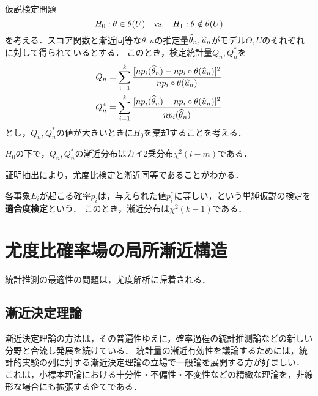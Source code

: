 \documentclass[uplatex,dvipdfmx]{jsreport}
\begin{document}
\begin{problem}
    仮説検定問題
    \[H_0:\theta\in\theta(U)\quad\mathrm{vs.}\quad H_1:\theta\notin\theta(U)\]
    を考える．スコア関数と漸近同等な$\theta,u$の推定量$\widehat{\theta}_n,\widehat{u}_n$がモデル$\Theta,U$のそれぞれに対して得られているとする．
    このとき，検定統計量$Q_n,Q_n^*$を
    \begin{align*}
        Q_n&=\sum^k_{i=1}\frac{[np_i(\widehat{\theta}_n)-np_i\circ\theta(\widehat{u}_n)]^2}{np_i\circ\theta(\widehat{u}_n)}\\
        Q_n^*&=\sum^k_{i=1}\frac{[np_i(\widehat{\theta}_n)-np_i\circ\theta(\widehat{u}_n)]^2}{np_i(\widehat{\theta}_n)}
    \end{align*}
    とし，$Q_n,Q_n^*$の値が大きいときに$H_0$を棄却することを考える．
\end{problem}

\begin{theorem}
    $H_0$の下で，$Q_n,Q_n^*$の漸近分布はカイ2乗分布$\chi^2(l-m)$である．
\end{theorem}
\begin{remarks}
    証明抽出により，尤度比検定と漸近同等であることがわかる．
\end{remarks}

\begin{example}
    各事象$E_i$が起こる確率$p_i$は，与えられた値$p^*_i$に等しい，という単純仮説の検定を\textbf{適合度検定}という．
    このとき，漸近分布は$\chi^2(k-1)$である．
\end{example}

\section{尤度比確率場の局所漸近構造}

\begin{tcolorbox}[colframe=ForestGreen, colback=ForestGreen!10!white,breakable,colbacktitle=ForestGreen!40!white,coltitle=black,fonttitle=\bfseries\sffamily,
title=]
    統計推測の最適性の問題は，尤度解析に帰着される．
\end{tcolorbox}

\subsection{漸近決定理論}

\begin{tcolorbox}[colframe=ForestGreen, colback=ForestGreen!10!white,breakable,colbacktitle=ForestGreen!40!white,coltitle=black,fonttitle=\bfseries\sffamily,
title=]
    漸近決定理論の方法は，その普遍性ゆえに，確率過程の統計推測論などの新しい分野と合流し発展を続けている．
    統計量の漸近有効性を議論するためには，統計的実験の列に対する漸近決定理論の立場で一般論を展開する方が好ましい．
    これは，小標本理論における十分性・不偏性・不変性などの精緻な理論を，非線形な場合にも拡張する企てである．
\end{tcolorbox}
\end{document}
